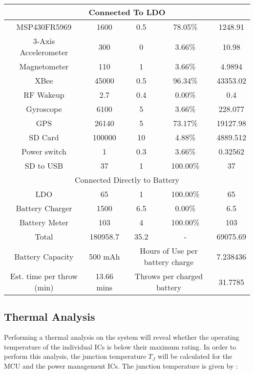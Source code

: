 \begin{center}
\begin{longtable}{|c|c|c|c|c|}
    \multicolumn{5}{|c|}{\cellcolor{Gray}Connected To LDO} \\ \hline
    MSP430FR5969 & 1600  & 0.5   & 78.05\% & 1248.91 \\ \hline
    3-Axis Accelerometer & 300   & 0     & 3.66\% & 10.98 \\ \hline
    Magnetometer & 110   & 1     & 3.66\% & 4.9894 \\ \hline
    XBee  & 45000 & 0.5   & 96.34\% & 43353.02 \\ \hline
    RF Wakeup & 2.7   & 0.4   & 0.00\% & 0.4 \\ \hline
    Gyroscope & 6100  & 5     & 3.66\% & 228.077 \\ \hline
    GPS   & 26140 & 5     & 73.17\% & 19127.98 \\ \hline
    SD Card & 100000 & 10    & 4.88\% & 4889.512 \\ \hline
    Power switch & 1     & 0.3   & 3.66\% & 0.32562 \\ \hline
    SD to USB & 37    & 1     & 100.00\% & 37 \\ \hline
    \multicolumn{5}{|c|}{\cellcolor{Gray}Connected Directly to Battery} \\ \hline
    LDO   & 65    & 1     & 100.00\% & 65 \\ \hline
    Battery Charger & 1500  & 6.5   & 0.00\% & 6.5 \\ \hline
    Battery Meter & 103   & 4     & 100.00\% & 103 \\ \hline \hline
    Total & 180958.7 & 35.2  &    -   & 69075.69 \\ \hline \hline
    Battery Capacity &   500 mAh    &      \multicolumn{2}{c|}{Hours of Use per battery charge} & 7.238436 \\ \hline
    Est. time per throw (min) & 13.66 mins  &    \multicolumn{2}{c|}{Throws per charged battery} & 31.7785 \\ \hline
    \end{longtable}%
\end{center}%

\subsection{Thermal Analysis}
Performing a thermal analysis on the system will reveal whether the operating temperature of the individual ICs is below their maximum rating.  In order to perform this analysis, the junction temperature $T_J$ will be calculated for the MCU and the power management ICs.  The junction temperature is given by \cite[419]{Jimenez2013}:

